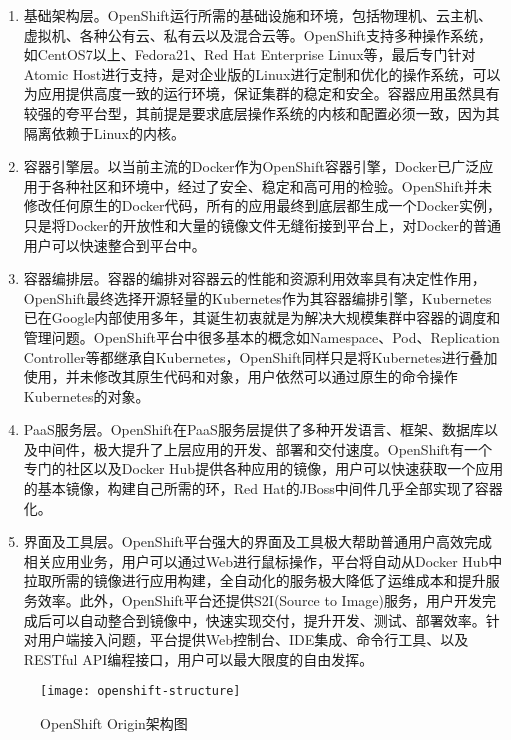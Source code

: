 \begin{enumerate}[1.]
	\item 基础架构层。OpenShift运行所需的基础设施和环境，包括物理机、云主机、虚拟机、各种公有云、私有云以及混合云等。OpenShift支持多种操作系统，如CentOS7以上、Fedora21、Red Hat Enterprise Linux等，最后专门针对Atomic Host进行支持，是对企业版的Linux进行定制和优化的操作系统，可以为应用提供高度一致的运行环境，保证集群的稳定和安全。容器应用虽然具有较强的夸平台型，其前提是要求底层操作系统的内核和配置必须一致，因为其隔离依赖于Linux的内核。
	\item 容器引擎层。以当前主流的Docker作为OpenShift容器引擎，Docker已广泛应用于各种社区和环境中，经过了安全、稳定和高可用的检验。OpenShift并未修改任何原生的Docker代码，所有的应用最终到底层都生成一个Docker实例，只是将Docker的开放性和大量的镜像文件无缝衔接到平台上，对Docker的普通用户可以快速整合到平台中。
	\item 容器编排层。容器的编排对容器云的性能和资源利用效率具有决定性作用，OpenShift最终选择开源轻量的Kubernetes作为其容器编排引擎，Kubernetes已在Google内部使用多年，其诞生初衷就是为解决大规模集群中容器的调度和管理问题。OpenShift平台中很多基本的概念如Namespace、Pod、Replication Controller等都继承自Kubernetes，OpenShift同样只是将Kubernetes进行叠加使用，并未修改其原生代码和对象，用户依然可以通过原生的命令操作Kubernetes的对象。
	\item PaaS服务层。OpenShift在PaaS服务层提供了多种开发语言、框架、数据库以及中间件，极大提升了上层应用的开发、部署和交付速度。OpenShift有一个专门的社区以及Docker Hub提供各种应用的镜像，用户可以快速获取一个应用的基本镜像，构建自己所需的环，Red Hat的JBoss中间件几乎全部实现了容器化。
	\item 界面及工具层。OpenShift平台强大的界面及工具极大帮助普通用户高效完成相关应用业务，用户可以通过Web进行鼠标操作，平台将自动从Docker Hub中拉取所需的镜像进行应用构建，全自动化的服务极大降低了运维成本和提升服务效率。此外，OpenShift平台还提供S2I(Source to Image)服务，用户开发完成后可以自动整合到镜像中，快速实现交付，提升开发、测试、部署效率。针对用户端接入问题，平台提供Web控制台、IDE集成、命令行工具、以及RESTful API编程接口，用户可以最大限度的自由发挥。
\end{enumerate}
\begin{figure}[H] %
	\centering
	\texttt{[image: openshift-structure]}
	\caption{OpenShift Origin架构图}
\end{figure}


